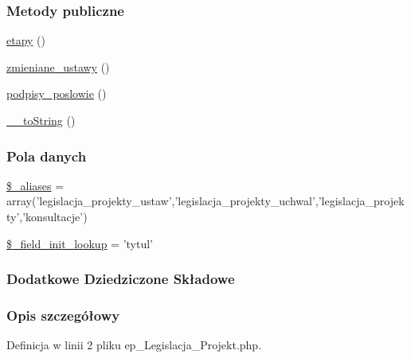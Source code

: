 \subsubsection*{Metody publiczne}
\begin{DoxyCompactItemize}
\item 
\hyperlink{classep___legislacja___projekt_a3dcbe271e680ead3863303e13573c195}{etapy} ()
\item 
\hyperlink{classep___legislacja___projekt_a8f7f16f34f1627d96a79ae2a18423970}{zmieniane\-\_\-ustawy} ()
\item 
\hyperlink{classep___legislacja___projekt_aa812d46d8996685e9583b7258aed9edd}{podpisy\-\_\-poslowie} ()
\item 
\hyperlink{classep___legislacja___projekt_a7516ca30af0db3cdbf9a7739b48ce91d}{\-\_\-\-\_\-to\-String} ()
\end{DoxyCompactItemize}
\subsubsection*{Pola danych}
\begin{DoxyCompactItemize}
\item 
\hyperlink{classep___legislacja___projekt_ab4e31d75f0bc5d512456911e5d01366b}{\$\-\_\-aliases} = array('legislacja\-\_\-projekty\-\_\-ustaw','legislacja\-\_\-projekty\-\_\-uchwal','legislacja\-\_\-projekty','konsultacje')
\item 
\hyperlink{classep___legislacja___projekt_a4a4d54ae35428077a7c61ec8a5139af3}{\$\-\_\-field\-\_\-init\-\_\-lookup} = 'tytul'
\end{DoxyCompactItemize}
\subsubsection*{Dodatkowe Dziedziczone Składowe}


\subsubsection{Opis szczegółowy}


Definicja w linii 2 pliku ep\-\_\-\-Legislacja\-\_\-\-Projekt.\-php.



